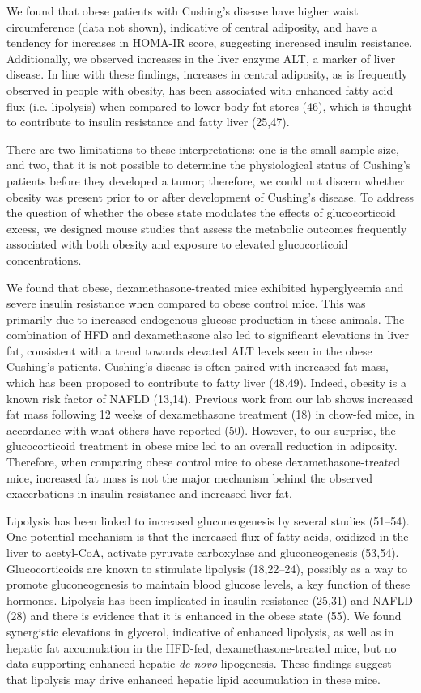\documentclass[11pt]{article} %
\begin{document}
We found that obese patients with Cushing's disease have higher waist
circumference (data not shown), indicative of central adiposity, and
have a tendency for increases in HOMA-IR score, suggesting increased
insulin resistance. Additionally, we observed increases in the liver
enzyme ALT, a marker of liver disease. In line with these findings,
increases in central adiposity, as is frequently observed in people with
obesity, has been associated with enhanced fatty acid flux (i.e.
lipolysis) when compared to lower body fat stores (46), which is thought
to contribute to insulin resistance and fatty liver (25,47).

There are two limitations to these interpretations: one is the small
sample size, and two, that it is not possible to determine the
physiological status of Cushing's patients before they developed a
tumor; therefore, we could not discern whether obesity was present prior
to or after development of Cushing's disease. To address the question of
whether the obese state modulates the effects of glucocorticoid excess,
we designed mouse studies that assess the metabolic outcomes frequently
associated with both obesity and exposure to elevated glucocorticoid
concentrations.

We found that obese, dexamethasone-treated mice exhibited hyperglycemia
and severe insulin resistance when compared to obese control mice. This
was primarily due to increased endogenous glucose production in these
animals. The combination of HFD and dexamethasone also led to
significant elevations in liver fat, consistent with a trend towards
elevated ALT levels seen in the obese Cushing's patients. Cushing's
disease is often paired with increased fat mass, which has been proposed
to contribute to fatty liver (48,49). Indeed, obesity is a known risk
factor of NAFLD (13,14). Previous work from our lab shows increased fat
mass following 12 weeks of dexamethasone treatment (18) in chow-fed
mice, in accordance with what others have reported (50). However, to our
surprise, the glucocorticoid treatment in obese mice led to an overall
reduction in adiposity. Therefore, when comparing obese control mice to
obese dexamethasone-treated mice, increased fat mass is not the major
mechanism behind the observed exacerbations in insulin resistance and
increased liver fat.

Lipolysis has been linked to increased gluconeogenesis by several
studies (51--54). One potential mechanism is that the increased flux of
fatty acids, oxidized in the liver to acetyl-CoA, activate pyruvate
carboxylase and gluconeogenesis (53,54). Glucocorticoids are known to
stimulate lipolysis (18,22--24), possibly as a way to promote
gluconeogenesis to maintain blood glucose levels, a key function of
these hormones. Lipolysis has been implicated in insulin resistance
(25,31) and NAFLD (28) and there is evidence that it is enhanced in the
obese state (55). We found synergistic elevations in glycerol,
indicative of enhanced lipolysis, as well as in hepatic fat accumulation
in the HFD-fed, dexamethasone-treated mice, but no data supporting
enhanced hepatic \emph{de novo} lipogenesis. These findings suggest that
lipolysis may drive enhanced hepatic lipid accumulation in these mice.
\end{document}
